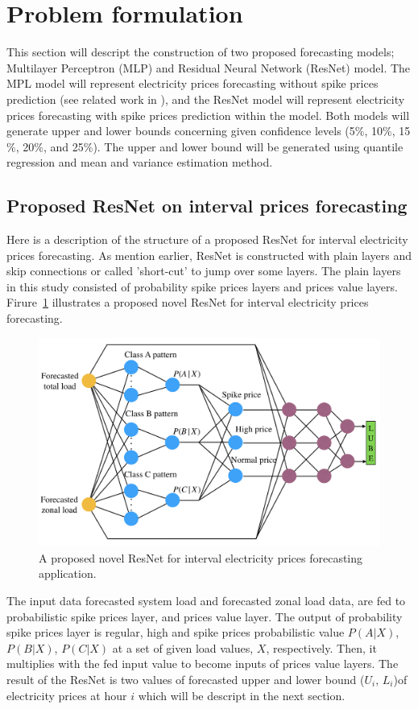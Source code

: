 \documentclass[review]{elsarticle}
\begin{document}
  \section{Problem formulation}
    This section will descript the construction of two proposed forecasting models; Multilayer Perceptron (MLP) and Residual Neural Network (ResNet) model.
    The MPL model will represent electricity prices forecasting without spike prices prediction (see related work in \cite{Dudek2016}), and the ResNet model will represent electricity prices forecasting with spike prices prediction within the model.
    Both models will generate upper and lower bounds concerning given confidence levels (5$\%$, 10$\%$, 15$\%$, 20$\%$, and 25$\%$).
    The upper and lower bound will be generated using quantile regression and mean and variance estimation method.

    \subsection{Proposed ResNet on interval prices forecasting}
      Here is a description of the structure of a proposed ResNet for interval electricity prices forecasting.
      As mention earlier, ResNet is constructed with plain layers and skip connections or called 'short-cut' to jump over some layers.
      The plain layers in this study consisted of probability spike prices layers and prices value layers.
      Firure~\ref{Fig:proposed_ResNet} illustrates a proposed novel ResNet for interval electricity prices forecasting.
      \begin{figure}[H]
        \includegraphics[width=12cm]{proposed_PDRNN}
        \caption{A proposed novel ResNet for interval electricity prices forecasting application.}
        \label{Fig:proposed_ResNet}
        \centering
      \end{figure}
      The input data forecasted system load and forecasted zonal load data, are fed to probabilistic spike prices layer, and prices value layer.
      The output of probability spike prices layer is regular, high and spike prices probabilistic value $P(A|X)$, $P(B|X)$, $P(C|X)$ at a set of given load values, $X$, respectively.
      Then, it multiplies with the fed input value to become inputs of prices value layers.
      The result of the ResNet is two values of forecasted upper and lower bound ($U_{i}$, $L_{i}$)of electricity prices at hour $i$ which will be descript in the next section.
\end{document}
